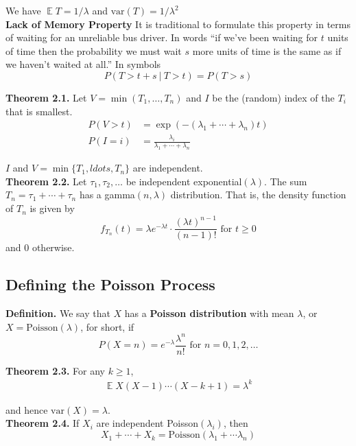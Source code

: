 \documentclass[12pt]{article}
\DeclareMathOperator*{\E}{\mathbb{E}}
\begin{document}
We have $\E T = 1/\lambda$ and $\text{var}(T) = 1/\lambda^2$\\

\textbf{Lack of Memory Property} It is traditional to formulate this property in terms of waiting for an unreliable bus driver. In words ``if we've been waiting for $t$ units of time then the probability we must wait $s$ more units of time is the same as if we haven't waited at all.'' In symbols $$P(T > t + s \ | \ T > t) = P(T > s)$$

\textbf{Theorem 2.1.} Let $V = \min(T_1, \ldots, T_n)$ and $I$ be the (random) index of the $T_i$ that is smallest.
\begin{align*}
P(V > t) &= \exp(-(\lambda_1 + \cdots + \lambda_n)t)\\
P(I = i) &= \frac{\lambda_i}{\lambda_1 + \cdots + \lambda_n}
\end{align*}

$I$ and $V = \min\{T_1, ldots, T_n\}$ are independent.\\

\textbf{Theorem 2.2.} Let $\tau_1, \tau_2, \ldots$ be independent exponential$(\lambda)$. The sum $T_n = \tau_1 + \cdots + \tau_n$ has a gamma$(n, \lambda)$ distribution. That is, the density function of $T_n$ is given by $$f_{T_n}(t) = \lambda e^{-\lambda t} \cdot \frac{(\lambda t)^{n-1}}{(n-1)!} \text{  for } t \geq 0$$ and $0$ otherwise.


\subsection{Defining the Poisson Process}

\textbf{Definition.} We say that $X$ has a \textbf{Poisson distribution} with mean $\lambda$, or $X = \text{Poisson}(\lambda)$, for short, if $$P(X = n) = e^{-\lambda}\frac{\lambda^n}{n!} \text{  for } n = 0, 1, 2, \ldots$$

\newpage
\textbf{Theorem 2.3.} For any $k \geq 1$,
\begin{align*}
\E X(X-1)\cdots(X-k+1) = \lambda^k
\end{align*}

and hence $\text{var}(X) = \lambda$.\\

\textbf{Theorem 2.4.} If $X_i$ are independent Poisson$(\lambda_i)$, then $$X_1 + \cdots + X_k = \text{Poisson}(\lambda_1 + \cdots \lambda_n)$$
\end{document}

